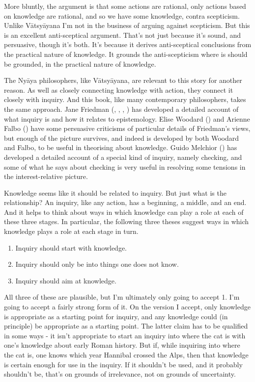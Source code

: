 \documentclass[
  10pt,
  letterpaper,
  twoside]{scrbook}
\providecommand{\tightlist}{%
  \setlength{\itemsep}{0pt}\setlength{\parskip}{0pt}}\usepackage{longtable,booktabs,array}
\begin{document}
More bluntly, the argument is that some actions are rational, only
actions based on knowledge are rational, and so we have some knowledge,
contra scepticism. Unlike Vātsyāyana I'm not in the business of arguing
against scepticism. But this is an excellent anti-sceptical argument.
That's not just because it's sound, and persuasive, though it's both.
It's because it derives anti-sceptical conclusions from the practical
nature of knowledge. It grounds the anti-scepticism where is should be
grounded, in the practical nature of knowledge.

The Nyāya philosophers, like Vātsyāyana, are relevant to this story for
another reason. As well as closely connecting knowledge with action,
they connect it closely with inquiry. And this book, like many
contemporary philosophers, takes the same approach. Jane Friedman
(,
, ,
) has developed a detailed account of
what inquiry is and how it relates to epistemology. Elise Woodard
() and Arienne Falbo
() have some persuasive criticisms of
particular details of Friedman's views, but enough of the picture
survives, and indeed is developed by both Woodard and Falbo, to be
useful in theorising about knowledge. Guido Melchior
() has developed a detailed account of
a special kind of inquiry, namely checking, and some of what he says
about checking is very useful in resolving some tensions in the
interest-relative picture.

Knowledge seems like it should be related to inquiry. But just what is
the relationship? An inquiry, like any action, has a beginning, a
middle, and an end. And it helps to think about ways in which knowledge
can play a role at each of these three stages. In particular, the
following three theses suggest ways in which knowledge plays a role at
each stage in turn.

\begin{enumerate}
\def\labelenumi{\arabic{enumi}.}
\tightlist
\item
  Inquiry should start with knowledge.
\item
  Inquiry should only be into things one does not know.
\item
  Inquiry should aim at knowledge.
\end{enumerate}

All three of these are plausible, but I'm ultimately only going to
accept 1. I'm going to accept a fairly strong form of it. On the version
I accept, only knowledge is appropriate as a starting point for inquiry,
and any knowledge could (in principle) be appropriate as a starting
point. The latter claim has to be qualified in some ways - it isn't
appropriate to start an inquiry into where the cat is with one's
knowledge about early Roman history. But if, while inquiring into where
the cat is, one knows which year Hannibal crossed the Alps, then that
knowledge is certain enough for use in the inquiry. If it shouldn't be
used, and it probably shouldn't be, that's on grounds of irrelevance,
not on grounds of uncertainty.
\end{document}
